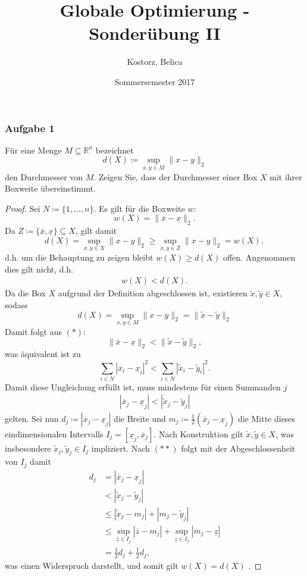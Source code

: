 \documentclass[12pt]{extreport} %
\title{Globale Optimierung - Sonderübung II}
\author{Kostorz, Belica}
\date{Sommersemester 2017}
\newcommand{\R}{\mathbb{R}}
\theoremstyle{named}
\theoremstyle{nnamed}
\theoremstyle{itshape}
\theoremstyle{normal}
\begin{document}
\thispagestyle{empty}
\thispagestyle{firststyle}

\subsubsection*{Aufgabe 1}

Für eine Menge $M \subseteq \R^n$ bezeichnet 
	$$ d(X) \coloneqq \sup_{x,y \in M} \| x - y \|_2 $$
den Durchmesser von $M$. Zeigen Sie, dass der Durchmesser einer Box $X$ mit ihrer Boxweite übereinstimmt.

\begin{proof}
	Sei $N \coloneqq \{1, \dotsc, n\}$. Es gilt für die Boxweite $w$:
	$$ w(X) = \| \overline{x} - \underline{x} \|_2. $$ 
	Da $Z \coloneqq \{ \overline{x}, \underline{x} \} \subseteq X$, gilt damit
	$$ d(X) = \sup_{x,y \in X} \| x - y \|_2 \geq \sup_{x,y \in Z } \| x - y \|_2 = w(X), $$
	d.h. um die Behauptung zu zeigen bleibt $w(X) \geq d(X)$ offen. Angenommen dies gilt nicht, d.h.
	\begin{align*}
		 w(X) < d(X). \tag*{$(*)$}
	\end{align*}
	Da die Box $X$ aufgrund der Definition abgeschlossen ist, existieren $\tilde{x}, \tilde{y} \in X$, sodass
	$$ d(X) = \sup_{x,y \in M} \| x - y \|_2 = \| \tilde{x} - \tilde{y} \|_2 $$
	Damit folgt aus $(*)$:
	 $$ \| \overline{x} - \underline{x} \|_2 < \| \tilde{x} - \tilde{y} \|_2, $$
	 was äquivalent ist zu
	 $$ \sum_{i \in N} | \overline{x}_i - \underline{x}_i |^2 < \sum_{ i \in N} | \tilde{x}_i - \tilde{y}_i |^2. $$
	Damit diese Ungleichung erfüllt ist, muss mindestens für einen Summanden $j$ 
	\begin{align*}
		| \overline{x}_j - \underline{x}_j | <  | \tilde{x}_j - \tilde{y}_j | \tag*{$(**)$}
	\end{align*} 
	gelten. Sei nun $d_j \coloneqq | \overline{x}_j - \underline{x}_j |$ die Breite und $m_j \coloneqq \frac{1}{2} \left( \overline{x}_j - \underline{x}_j \right)$ die Mitte dieses eindimensionalen Intervalls $I_j = \left[ \underline{x}_j, \overline{x}_j \right]$. Nach Konstruktion gilt $\tilde{x}, \tilde{y} \in X$, was insbesondere $\tilde{x}_j, \tilde{y}_j \in I_j$ impliziert. Nach $(**)$ folgt mit der Abgeschlossenheit von $I_j$ damit
	\begin{align*}
		d_j & = \left| \overline{x}_j - \underline{x}_j \right| \\
			& <  \left| \tilde{x}_j - \tilde{y}_j \right| \\
			& \leq \left| \tilde{x}_j - m_j \right| + \left| m_j - \tilde{y}_j \right| \\
			& \leq \sup_{\overline{z} \in I_j} \left| \overline{z} - m_j \right| + \sup_{\underline{z} \in I_j} \left| m_j - \underline{z} \right|  \\ 
			& =  \frac{1}{2} d_j + \frac{1}{2} d_j,
	\end{align*}
	was einen Widerspruch darstellt, und somit gilt $w(X) = d(X)$ .
\end{proof}
\end{document}
